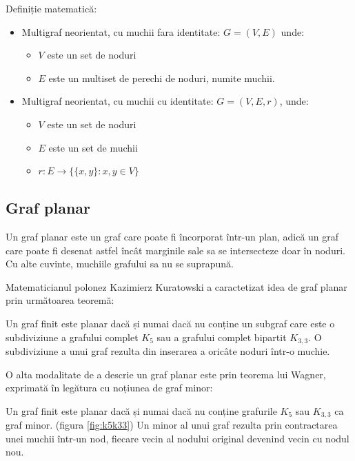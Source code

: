Definiție matematică:\newline

\begin{itemize}
\item Multigraf neorientat, cu muchii fara identitate: 
\(G=(V,E)\) unde:
\begin{itemize}
    \item \(V\) este un set de noduri 
    \item \(E\) este un multiset de perechi de noduri, numite muchii.
\end{itemize}

    
\item Multigraf neorientat, cu muchii cu identitate:
\(G=(V,E,r)\), unde:
\begin{itemize}
    \item \(V\) este un set de noduri
    \item \(E\) este un set de muchii
    \item \(r : E → \{\{x,y\} : x, y \in V\}\)
\end{itemize}

\end{itemize}

\subsection{Graf planar}

Un graf planar este un graf care poate fi încorporat într-un plan, adică un graf care poate fi desenat astfel încât 
marginile sale sa se intersecteze doar în noduri. Cu alte cuvinte, muchiile grafului sa nu se suprapună.\newline

Matematicianul polonez Kazimierz Kuratowski a caractetizat idea de graf planar prin următoarea teoremă:\newline

Un graf finit este planar dacă și numai dacă nu conține un subgraf care este o subdiviziune a grafului complet \(K_5\) sau a grafului complet bipartit \(K_{3,3}\).
O subdiviziune a unui graf rezulta din inserarea a oricâte noduri într-o muchie.\newline

O alta modalitate de a descrie un graf planar este prin teorema lui Wagner, exprimată în legătura cu noțiunea de graf minor:\newline
 
Un graf finit este planar dacă și numai dacă nu conține grafurile \(K_5\) sau \(K_{3,3}\) ca graf minor. (figura \ref{fig:k5k33})
Un minor al unui graf rezulta prin contractarea unei muchii într-un nod, fiecare vecin al nodului original devenind vecin cu nodul nou.\newline

